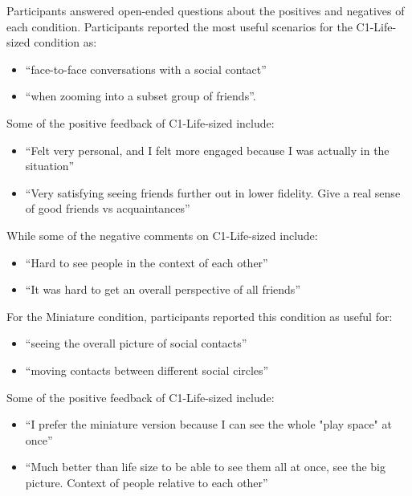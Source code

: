 Participants answered open-ended questions about the positives and negatives of each condition. Participants reported the most useful scenarios for the C1-Life-sized condition as:

\begin{itemize}
    \item \enquote{face-to-face conversations with a social contact}
    \item \enquote{when zooming into a subset group of friends}. 
\end{itemize}

Some of the positive feedback of C1-Life-sized include:

\begin{itemize}
    \item \enquote{Felt very personal, and I felt more engaged because I was actually in the situation}
    \item \enquote{Very satisfying seeing friends further out in lower fidelity. Give a real sense of good friends vs acquaintances}
\end{itemize}

While some of the negative comments on C1-Life-sized include:

\begin{itemize}
    \item \enquote{Hard to see people in the context of each other}
    \item \enquote{It was hard to get an overall perspective of all friends}
\end{itemize}
 
For the Miniature condition, participants reported this condition as useful for: 

\begin{itemize}
    \item \enquote{seeing the overall picture of social contacts} 
    \item \enquote{moving contacts between different social circles} 
\end{itemize}

Some of the positive feedback of C1-Life-sized include:

\begin{itemize}
    \item \enquote{I prefer the miniature version because I can see the whole "play space" at once}
    \item \enquote{Much better than life size to be able to see them all at once, see the big picture. Context of people relative to each other}
\end{itemize}

